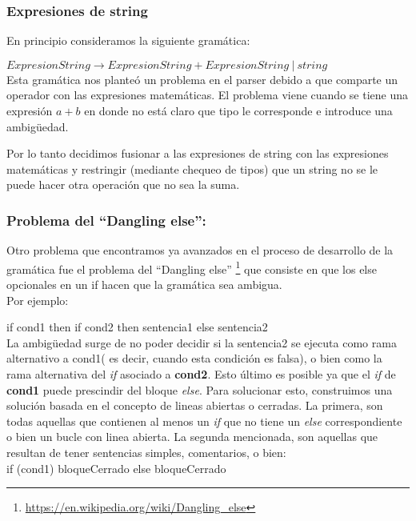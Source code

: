 \subsubsection{Expresiones de string}
En principio consideramos la siguiente gramática:

$ExpresionString \rightarrow ExpresionString + ExpresionString \ | \ string$ \\

Esta gramática nos planteó un problema en el parser debido a que comparte un operador con las expresiones matemáticas. El problema viene cuando se tiene una expresión $a+b$ en donde no está claro que tipo le corresponde e introduce una ambigüedad.

Por lo tanto decidimos fusionar a las expresiones de string con las expresiones matemáticas y restringir (mediante chequeo de tipos) que un string no se le puede hacer otra operación que no sea la suma.

\subsubsection{Problema del ``Dangling else'':}

Otro problema que encontramos ya avanzados en el proceso de desarrollo de la gramática fue el problema del ``Dangling else'' \footnote{\url{https://en.wikipedia.org/wiki/Dangling_else}} que consiste en que los else opcionales en un if hacen que la gramática sea ambigua. 
\\
Por ejemplo: 

if cond1 then if cond2 then sentencia1 else sentencia2 \\

La ambigüedad surge de no poder decidir si la sentencia2 se ejecuta como rama alternativo a cond1( es decir, cuando esta condición es falsa), o bien como la rama alternativa del \textit{if} asociado a \textbf{cond2}. Esto último es posible ya que el \textit{if} de \textbf{cond1} puede prescindir del bloque \textit{else}.
Para solucionar esto, construimos una solución basada en el concepto de lineas abiertas o cerradas. La primera, son todas aquellas que contienen al menos un \textit{if} que no tiene un \textit{else} correspondiente o bien un bucle con linea abierta. La segunda mencionada, son aquellas que resultan de tener sentencias simples, comentarios, o bien: \\

if (cond1) bloqueCerrado else bloqueCerrado \\

